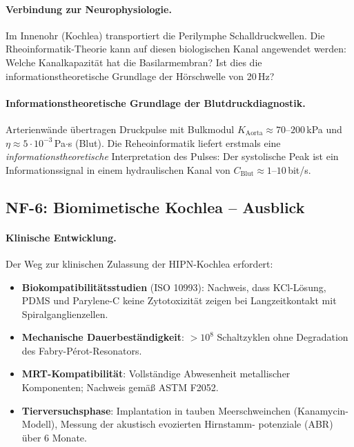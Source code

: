 ﻿\documentclass[a4paper,12pt]{scrreprt}
\theoremstyle{definition}
\begin{document}
\paragraph{Verbindung zur Neurophysiologie.}
Im Innenohr (Kochlea) transportiert die Perilymphe Schalldruckwellen.
Die Rheoinformatik-Theorie kann auf diesen biologischen Kanal angewendet werden:
Welche Kanalkapazität hat die Basilarmembran? Ist dies die informationstheoretische
Grundlage der Hörschwelle von 20\,Hz?

\paragraph{Informationstheoretische Grundlage der Blutdruckdiagnostik.}
Arterienwände übertragen Druckpulse mit Bulkmodul
$K_\mathrm{Aorta} \approx 70$--$200$\,kPa und
$\eta \approx 5 \cdot 10^{-3}$\,Pa$\cdot$s (Blut). Die
Reheoinformatik liefert erstmals eine \emph{informationstheoretische}
Interpretation des Pulses: Der systolische Peak ist ein
Informationssignal in einem hydraulischen Kanal von
$C_\mathrm{Blut} \approx 1$--$10$\,bit/s.

\subsection*{NF-6: Biomimetische Kochlea -- Ausblick}

\paragraph{Klinische Entwicklung.}
Der Weg zur klinischen Zulassung der HIPN-Kochlea erfordert:
\begin{itemize}
  \item \textbf{Biokompatibilitätsstudien} (ISO 10993): Nachweis,
    dass KCl-Lösung, PDMS und Parylene-C keine Zytotoxizität
    zeigen bei Langzeitkontakt mit Spiralganglienzellen.
  \item \textbf{Mechanische Dauerbeständigkeit}: $> 10^8$
    Schaltzyklen ohne Degradation des Fabry-Pérot-Resonators.
  \item \textbf{MRT-Kompatibilität}: Vollständige Abwesenheit
    metallischer Komponenten; Nachweis gemäß ASTM F2052.
  \item \textbf{Tierversuchsphase}: Implantation in tauben Meerschweinchen
    (Kanamycin-Modell), Messung der akustisch evozierten Hirnstamm-
    potenziale (ABR) über 6 Monate.
\end{itemize}
\end{document}
